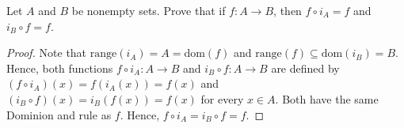 \documentclass[12pt]{article}
\newcommand{\Dom}[1]{\mathrm{dom}(#1)}
\newcommand{\Range}[1]{\mathrm{range}(#1)}
\newenvironment{problem}[2][Problem]{\begin{trivlist} \item[\hskip \labelsep {\bfseries #1}\hskip \labelsep {\bfseries #2.}]}{\end{trivlist}}
\begin{document}
    \begin{problem}{40}
      Let $A$ and $B$ be nonempty sets. Prove that if $f:A\to B$, then $f\circ i_{A} = f$ and $i_{B} \circ f = f$.
    \begin{proof}
      Note that $\Range{i_{A}} = A = \Dom{f}$ and $\Range{f} \subseteq \Dom{i_{B}} = B$. Hence, both functions $f\circ i_{A}:A\to B$ and $i_{B}\circ f:A\to B$ are defined by $(f\circ i_{A})(x) = f(i_{A}(x))=f(x)$ and $(i_{B}\circ f)(x) = i_{B}(f(x))= f(x)$ for every $x\in A$. Both have the same Dominion and rule as $f$. Hence, $f\circ i_{A} = i_{B} \circ f = f$.
    \end{proof}
    \end{problem}
       
\end{document}
